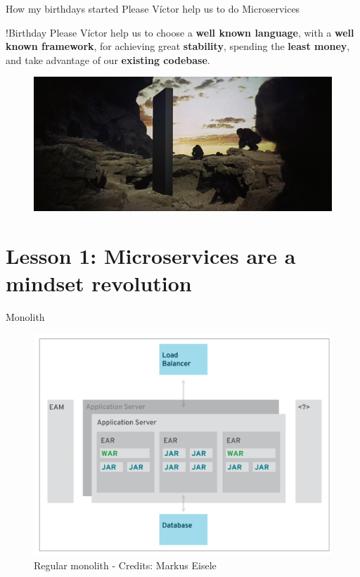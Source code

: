 \documentclass{beamer}
\begin{document}
\begin{frame}{How my birthdays started}
Please Víctor help us to do Microservices

\end{frame}


\begin{frame}{!Birthday}
Please Víctor help us to choose a \textbf{well known language}, with a \textbf{well known framework}, for achieving great \textbf{stability}, spending the \textbf{least money}, and take advantage of our \textbf{existing codebase}.

\begin{figure}
	\centering
	\includegraphics[width=\linewidth]{Images/monolith}
\end{figure}
\end{frame}

\section{Lesson 1: Microservices are a mindset revolution}
\begin{frame}{Monolith}
\begin{figure}
\centering
\includegraphics[width=0.7\linewidth]{Images/monolitos}
\caption{Regular monolith - Credits: Markus Eisele}
\end{figure}
\end{frame}
\end{document}

